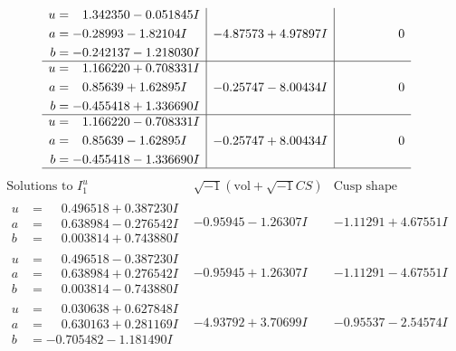 \documentclass[1p]{elsarticle_modified}
\theoremstyle{definition}
\newcommand{\I}{\sqrt{-1}}
\begin{document}
$$\begin{array}{c|c|c}
\begin{aligned}
u &= \phantom{-}1.342350 - 0.051845 I \\
a &= -0.28993 - 1.82104 I \\
b &= -0.242137 - 1.218030 I\end{aligned}
 & -4.87573 + 4.97897 I & \phantom{-0.000000 } 0 \\ \hline\begin{aligned}
u &= \phantom{-}1.166220 + 0.708331 I \\
a &= \phantom{-}0.85639 + 1.62895 I \\
b &= -0.455418 + 1.336690 I\end{aligned}
 & -0.25747 - 8.00434 I & \phantom{-0.000000 } 0 \\ \hline\begin{aligned}
u &= \phantom{-}1.166220 - 0.708331 I \\
a &= \phantom{-}0.85639 - 1.62895 I \\
b &= -0.455418 - 1.336690 I\end{aligned}
 & -0.25747 + 8.00434 I & \phantom{-0.000000 } 0\\
 \hline 
 \end{array}$$\newpage$$\begin{array}{c|c|c}  
\text{Solutions to }I^u_{1}& \I (\text{vol} + \sqrt{-1}CS) & \text{Cusp shape}\\
 \hline 
\begin{aligned}
u &= \phantom{-}0.496518 + 0.387230 I \\
a &= \phantom{-}0.638984 - 0.276542 I \\
b &= \phantom{-}0.003814 + 0.743880 I\end{aligned}
 & -0.95945 - 1.26307 I & -1.11291 + 4.67551 I \\ \hline\begin{aligned}
u &= \phantom{-}0.496518 - 0.387230 I \\
a &= \phantom{-}0.638984 + 0.276542 I \\
b &= \phantom{-}0.003814 - 0.743880 I\end{aligned}
 & -0.95945 + 1.26307 I & -1.11291 - 4.67551 I \\ \hline\begin{aligned}
u &= \phantom{-}0.030638 + 0.627848 I \\
a &= \phantom{-}0.630163 + 0.281169 I \\
b &= -0.705482 - 1.181490 I\end{aligned}
 & -4.93792 + 3.70699 I & -0.95537 - 2.54574 I \\ \hline\begin{aligned}

\end{aligned}
\end{array}$$
\end{document}
